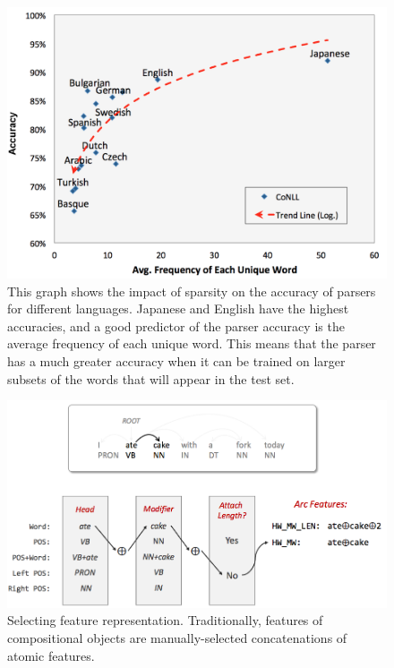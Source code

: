 \documentclass[justified, marginals=justified]{tufte-handout}
\begin{document}
\begin{figure}
  \includegraphics[width=\linewidth]{sparsity2.png}
  \caption{This graph shows the impact of sparsity on the accuracy of parsers for different languages. Japanese and English have the highest accuracies, and a good predictor of the parser accuracy is the average frequency of each unique word. This means that the parser has a much greater accuracy when it can be trained on larger subsets of the words that will appear in the test set.}
  \label{fig:sparsity2}
  \centering
\end{figure}


\begin{figure}
  \includegraphics[width=\linewidth]{feature-engineering.png}
  \caption{Selecting feature representation. Traditionally, features of compositional objects are manually-selected concatenations of atomic features.}
  \label{fig:feature-engineering}
  \centering
\end{figure}
\end{document}
